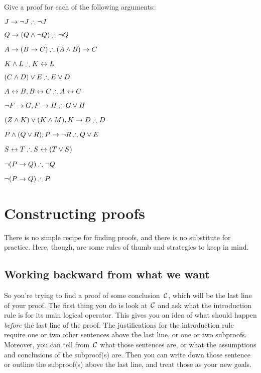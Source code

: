 \solutions
\problempart
\label{pr.solvedTFLproofs}
Give a proof for each of the following arguments:
\begin{compactlist}
\item $J\eif\enot J \therefore \enot J$
\item $Q\eif(Q\eand\enot Q) \therefore \enot Q$
\item $A\eif (B\eif C) \therefore (A\eand B)\eif C$
\item $K\eand L \therefore K\eiff L$
\item $(C\eand D)\eor E \therefore E\eor D$
\item $A\eiff B, B\eiff C \therefore A\eiff C$
\item $\enot F\eif G, F\eif H \therefore G\eor H$
\item $(Z\eand K) \eor (K\eand M), K \eif D \therefore D$
\item $P \eand (Q\eor R), P\eif \enot R \therefore Q\eor E$
\item $S\eiff T \therefore S\eiff (T\eor S)$
\item $\enot (P \eif Q) \therefore \enot Q$
\item $\enot (P \eif Q) \therefore P$
\end{compactlist}


\chapter{Constructing proofs}\label{s:stratTFL}

There is no simple recipe for finding proofs, and there is no substitute for practice. Here, though, are some rules of thumb and strategies to keep in mind.

\section{Working backward from what we want}

So you're trying to find a proof of some conclusion~$\mathcal{C}$, which will be the last line of your proof. The first thing you do is look at~$\mathcal{C}$ and ask what the introduction rule is for its main logical operator. This gives you an idea of what should happen \emph{before} the last line of the proof. The justifications for the introduction rule require one or two other sentences above the last line, or one or two subproofs. Moreover, you can tell from~$\mathcal{C}$ what those sentences are, or what the assumptions and conclusions of the subproof(s) are. Then you can write down those sentence or outline the subproof(s) above the last line, and treat those as your new goals.

